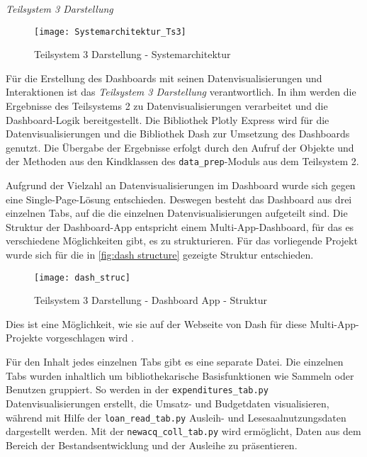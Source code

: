     \noindent
    \textit{Teilsystem 3 Darstellung}\\

    \begin{figure}[H]
        \centering
            \texttt{[image: Systemarchitektur\_Ts3]}
            \caption{Teilsystem 3 Darstellung - Systemarchitektur}
            \label{fig:Systemarchitektur Teilsystem 3}
    \end{figure}

    Für die Erstellung des Dashboards mit seinen Datenvisualisierungen und Interaktionen ist das \textit{Teilsystem 3 Darstellung} verantwortlich.
    In ihm werden die Ergebnisse des Teilsystems 2 zu Datenvisualisierungen verarbeitet und die Dashboard-Logik bereitgestellt.
    Die Bibliothek Plotly Express wird für die Datenvisualisierungen und die Bibliothek Dash zur Umsetzung des Dashboards genutzt. 
    Die Übergabe der Ergebnisse erfolgt durch den Aufruf der Objekte und der Methoden aus den Kindklassen des \texttt{data\_prep}-Moduls aus dem Teilsystem 2.
    
    Aufgrund der Vielzahl an Datenvisualisierungen im Dashboard wurde sich gegen eine Single-Page-Lösung entschieden. Deswegen besteht das Dashboard
    aus drei einzelnen Tabs, auf die die einzelnen Datenvisualisierungen aufgeteilt sind. Die Struktur der Dashboard-App entspricht einem Multi-App-Dashboard,
    für das es verschiedene Möglichkeiten gibt, es zu strukturieren.
    Für das vorliegende Projekt wurde sich für die in 
    \autoref{fig:dash structure} gezeigte Struktur entschieden.

    \begin{figure}[H]
        \centering
            \texttt{[image: dash\_struc]}
            \caption{Teilsystem 3 Darstellung - Dashboard App - Struktur}
            \label{fig:dash structure}
    \end{figure}
    
    Dies ist eine Möglichkeit, wie sie auf der Webseite von Dash für diese Multi-App-Projekte vorgeschlagen wird \cite[vgl.][]{plotly_url_2021}.
    
    Für den Inhalt jedes einzelnen Tabs gibt es eine separate Datei.
    Die einzelnen Tabs wurden inhaltlich um bibliothekarische Basisfunktionen wie Sammeln oder Benutzen gruppiert. So werden in der \texttt{expenditures\_tab.py}
    Datenvisualisierungen erstellt, die Umsatz- und Budgetdaten visualisieren, während mit Hilfe der \texttt{loan\_read\_tab.py}
    Ausleih- und Lesesaalnutzungsdaten dargestellt werden. Mit der \texttt{newacq\_coll\_tab.py} wird ermöglicht, Daten aus dem Bereich der Bestandsentwicklung und der 
    Ausleihe zu präsentieren.

